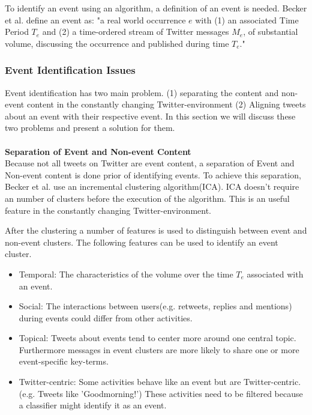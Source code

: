 \documentclass{article}
\begin{document}
To identify an event using an algorithm, a definition of an event is needed. Becker et al.  define an event as: "a real world occurrence $e$ with (1) an associated Time Period $T_e$ and (2) a time-ordered stream of Twitter messages $M_e$, of substantial volume, discussing the occurrence and published during time $T_e$." \cite{eventident} 

\subsubsection*{Event Identification Issues}
Event identification has two main problem. (1) separating the content and non-event content in the constantly changing 
Twitter-environment (2) Aligning tweets about an event with their respective event. In this section we will discuss these two problems and present a solution for them.
\\\\ 
\textbf{Separation of Event and Non-event Content}\\
Because not all tweets on Twitter are event content, a separation of Event and Non-event content is done prior of identifying events. To achieve this separation, Becker et al.  use an incremental clustering algorithm(ICA). ICA doesn't require an number of clusters before the execution of the algorithm. This is an useful feature in the constantly changing Twitter-environment. \cite{eventident} 

After the clustering a number of features is used to distinguish between event and non-event clusters. The following features can be used to identify an event cluster. \cite{eventident} 
\begin{itemize}
  \item Temporal: The characteristics of the volume over the time $T_e$ associated with an event. 
  \item Social: The interactions between users(e.g. retweets, replies and mentions) during events could differ from other activities. 
  \item Topical: Tweets about events tend to center more around one central topic. Furthermore messages in event clusters are more likely to share one or more event-specific key-terms.  
  \item Twitter-centric: Some activities behave like an event but are Twitter-centric.(e.g. Tweets like 'Goodmorning!') These activities need to be filtered because a classifier might identify it as an event. 
\end{itemize}
\end{document}
